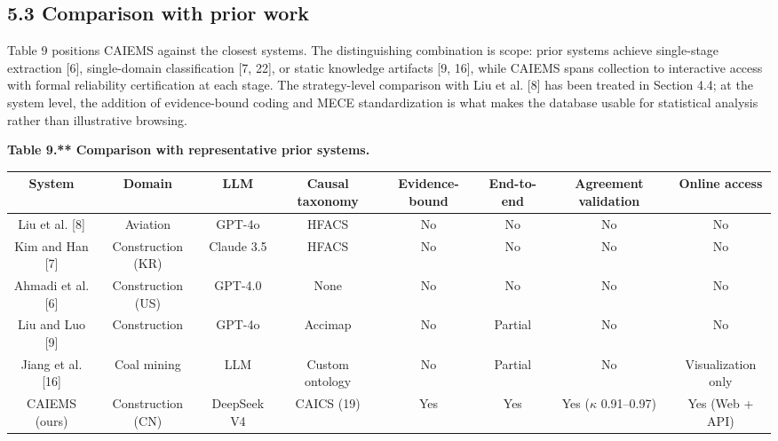 \documentclass[11pt]{article}
\begin{document}
\subsection{5.3 Comparison with prior work}
Table 9 positions CAIEMS against the closest systems. The distinguishing combination is scope: prior systems achieve single-stage extraction [6], single-domain classification [7, 22], or static knowledge artifacts [9, 16], while CAIEMS spans collection to interactive access with formal reliability certification at each stage. The strategy-level comparison with Liu et al. [8] has been treated in Section 4.4; at the system level, the addition of evidence-bound coding and MECE standardization is what makes the database usable for statistical analysis rather than illustrative browsing.

\textbf{Table 9.** Comparison with representative prior systems.}
\begin{table}[htbp]
\centering
\small
\begin{tabular}{cccccccc}
\hline
System & Domain & LLM & Causal taxonomy & Evidence-bound & End-to-end & Agreement validation & Online access \\
\hline
Liu et al. [8] & Aviation & GPT-4o & HFACS & No & No & No & No \\
Kim and Han [7] & Construction (KR) & Claude 3.5 & HFACS & No & No & No & No \\
Ahmadi et al. [6] & Construction (US) & GPT-4.0 & None & No & No & No & No \\
Liu and Luo [9] & Construction & GPT-4o & Accimap & No & Partial & No & No \\
Jiang et al. [16] & Coal mining & LLM & Custom ontology & No & Partial & No & Visualization only \\
CAIEMS (ours) & Construction (CN) & DeepSeek V4 & CAICS (19) & Yes & Yes & Yes ($\kappa$ 0.91--0.97) & Yes (Web + API) \\
\hline
\end{tabular}
\end{table}
\end{document}
